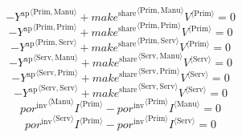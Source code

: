 \begin{equation}
-{Y^{\mathrm{ap}}}^{\langle \mathrm{Prim},\mathrm{Manu}\rangle} + {{{m\!a\!k\!e}^{\mathrm{share}}}^{\langle \mathrm{\mathrm{Prim}},\mathrm{\mathrm{Manu}}\rangle}} {{V}^{\langle \mathrm{Prim}\rangle}} = 0
\end{equation}
\begin{equation}
-{Y^{\mathrm{ap}}}^{\langle \mathrm{Prim},\mathrm{Prim}\rangle} + {{{m\!a\!k\!e}^{\mathrm{share}}}^{\langle \mathrm{\mathrm{Prim}},\mathrm{\mathrm{Prim}}\rangle}} {{V}^{\langle \mathrm{Prim}\rangle}} = 0
\end{equation}
\begin{equation}
-{Y^{\mathrm{ap}}}^{\langle \mathrm{Prim},\mathrm{Serv}\rangle} + {{{m\!a\!k\!e}^{\mathrm{share}}}^{\langle \mathrm{\mathrm{Prim}},\mathrm{\mathrm{Serv}}\rangle}} {{V}^{\langle \mathrm{Prim}\rangle}} = 0
\end{equation}
\begin{equation}
-{Y^{\mathrm{ap}}}^{\langle \mathrm{Serv},\mathrm{Manu}\rangle} + {{{m\!a\!k\!e}^{\mathrm{share}}}^{\langle \mathrm{\mathrm{Serv}},\mathrm{\mathrm{Manu}}\rangle}} {{V}^{\langle \mathrm{Serv}\rangle}} = 0
\end{equation}
\begin{equation}
-{Y^{\mathrm{ap}}}^{\langle \mathrm{Serv},\mathrm{Prim}\rangle} + {{{m\!a\!k\!e}^{\mathrm{share}}}^{\langle \mathrm{\mathrm{Serv}},\mathrm{\mathrm{Prim}}\rangle}} {{V}^{\langle \mathrm{Serv}\rangle}} = 0
\end{equation}
\begin{equation}
-{Y^{\mathrm{ap}}}^{\langle \mathrm{Serv},\mathrm{Serv}\rangle} + {{{m\!a\!k\!e}^{\mathrm{share}}}^{\langle \mathrm{\mathrm{Serv}},\mathrm{\mathrm{Serv}}\rangle}} {{V}^{\langle \mathrm{Serv}\rangle}} = 0
\end{equation}
\begin{equation}
{{{p\!o\!r}^{\mathrm{inv}}}^{\langle \mathrm{\mathrm{Manu}}\rangle}} {{I}^{\langle \mathrm{Prim}\rangle}} - {{{p\!o\!r}^{\mathrm{inv}}}^{\langle \mathrm{\mathrm{Prim}}\rangle}} {{I}^{\langle \mathrm{Manu}\rangle}} = 0
\end{equation}
\begin{equation}
{{{p\!o\!r}^{\mathrm{inv}}}^{\langle \mathrm{\mathrm{Serv}}\rangle}} {{I}^{\langle \mathrm{Prim}\rangle}} - {{{p\!o\!r}^{\mathrm{inv}}}^{\langle \mathrm{\mathrm{Prim}}\rangle}} {{I}^{\langle \mathrm{Serv}\rangle}} = 0
\end{equation}
